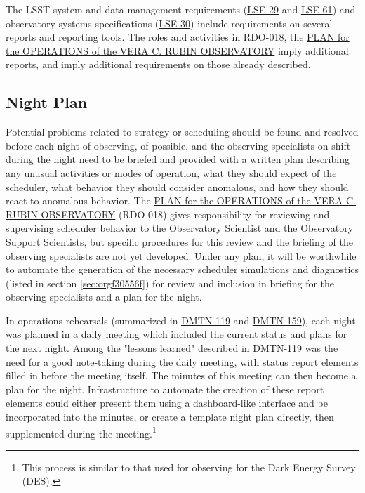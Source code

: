 The LSST system and data management requirements (\href{https://ls.st/lse-29}{LSE-29} and \href{https://ls.st/lse-61}{LSE-61}) and observatory systems specifications (\href{https://ls.st/lse-30}{LSE-30}) include requirements on several reports and reporting tools. The roles and activities in RDO-018, the \href{https://docushare.lsst.org/docushare/dsweb/Get/RDO-018}{PLAN for the OPERATIONS of the VERA C. RUBIN OBSERVATORY} imply additional reports, and imply additional requirements on those already described.

\subsection{Night Plan}
\label{sec:org21d0a94}

Potential problems related to strategy or scheduling should be found and resolved before each night of observing, of possible, and the observing specialists on shift during the night need to be briefed and provided with a written plan describing any unusual activities or modes of operation, what they should expect of the scheduler, what behavior they should consider anomalous, and how they should react to anomalous behavior.
The \href{https://docushare.lsst.org/docushare/dsweb/Get/RDO-018}{PLAN for the OPERATIONS of the VERA C. RUBIN OBSERVATORY} (RDO-018) gives responsibility for reviewing and supervising scheduler behavior to the Observatory Scientist and the Observatory Support Scientists, but specific procedures for this review and the briefing of the observing specialists are not yet developed.
Under any plan, it will be worthwhile to automate the generation of the necessary scheduler simulations and diagnostics (listed in section \ref{sec:orgf30556f}) for review and inclusion in briefing for the observing specialists and a plan for the night.

In operations rehearsals (summarized in \href{https://dmtn-119.lsst.io}{DMTN-119} and \href{https://dmtn-159.lsst.io/}{DMTN-159}), each night was planned in a daily meeting which included the current status and plans for the next night.
Among the "lessons learned" described in DMTN-119 was the need for a good note-taking during the daily meeting, with status report elements filled in before the meeting itself. 
The minutes of this meeting can then become a plan for the night.
Infrastructure to automate the creation of these report elements could either present them using a dashboard-like interface and be incorporated into the minutes, or create a template night plan directly, then supplemented during the meeting.\footnote{This process is similar to that used for observing for the Dark Energy Survey (DES).}


